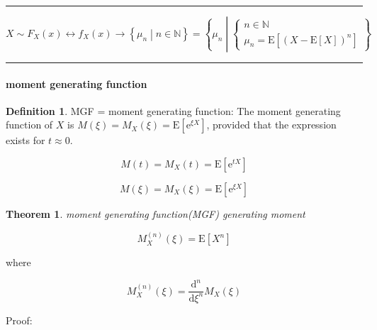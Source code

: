 \documentclass[
]{book}
\newtheorem{theorem}{Theorem}[chapter]
\theoremstyle{definition}
\newtheorem{definition}{Definition}[chapter]
\theoremstyle{definition}
\theoremstyle{definition}
\theoremstyle{definition}
\theoremstyle{remark}
\begin{document}
\begin{center}\rule{0.5\linewidth}{0.5pt}\end{center}

\[
X\sim F_{{\scriptscriptstyle X}}\left(x\right)\leftrightarrow f_{{\scriptscriptstyle X}}\left(x\right)\rightarrow\left\{ \mu_{{\scriptscriptstyle n}}\middle|n\in\mathbb{N}\right\} =\left\{ \mu_{{\scriptscriptstyle n}}\middle|\begin{cases}
n\in\mathbb{N}\\
\mu_{{\scriptscriptstyle n}}=\mathrm{E}\left[\left(X-\mathrm{E}\left[X\right]\right)^{n}\right]
\end{cases}\right\} 
\]

\begin{center}\rule{0.5\linewidth}{0.5pt}\end{center}

\paragraph{moment generating function}\label{moment-generating-function}

\begin{definition}
\protect\hypertarget{def:unnamed-chunk-26}{}\label{def:unnamed-chunk-26}MGF = moment generating function: The moment generating function of \(X\) is \(M\left(\xi\right)=M_{{\scriptscriptstyle X}}\left(\xi\right)=\mathrm{E}\left[\mathrm{e}^{\xi X}\right]\), provided that the expression exists for \(t\approx0\).
\end{definition}

\[
M\left(t\right)=M_{{\scriptscriptstyle X}}\left(t\right)=\mathrm{E}\left[\mathrm{e}^{tX}\right]
\]

\[
M\left(\xi\right)=M_{{\scriptscriptstyle X}}\left(\xi\right)=\mathrm{E}\left[\mathrm{e}^{\xi X}\right]
\]

\begin{theorem}
\protect\hypertarget{thm:unnamed-chunk-27}{}\label{thm:unnamed-chunk-27}moment generating function(MGF) generating moment
\end{theorem}

\[
M_{{\scriptscriptstyle X}}^{\left(n\right)}\left(\xi\right)=\mathrm{E}\left[X^{n}\right]
\]

where

\[
M_{{\scriptscriptstyle X}}^{\left(n\right)}\left(\xi\right)=\dfrac{\mathrm{d}^{n}}{\mathrm{d}\xi^{n}}M_{{\scriptscriptstyle X}}\left(\xi\right)
\]

Proof:
\end{document}
